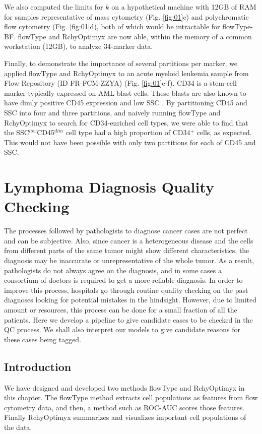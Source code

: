 We also computed the limits for $k$ on a hypothetical machine with 12GB of RAM for samples representative of mass cytometry (Fig. \ref{fig:01}c) and polychromatic flow cytometry (Fig. \ref{fig:01}d), both of which would be intractable for flowType-BF.
flowType and RchyOptimyx are now able, within the memory of a common workstation (12GB), to analyze 34-marker data. 

Finally, to demonstrate the importance of several partitions per marker, we applied flowType and RchyOptimyx to an acute myeloid leukemia sample from Flow Repository (ID FR-FCM-ZZYA) (Fig. \ref{fig:01}e-f).
CD34 is a stem-cell marker typically expressed on AML blast cells. These blasts are also known to have dimly positive CD45 expression and low SSC \cite{Vial2001}. 
By partitioning CD45 and SSC into four and three partitions, and naively running flowType and RchyOptimyx to search for CD34-enriched cell types, we were able to find that the SSC$^{low}$CD45$^{dim}$ cell type had a high proportion of CD34$^+$ cells, as expected.
This would not have been possible with only two partitions for each of CD45 and SSC.


\section{Lymphoma Diagnosis Quality Checking}
The processes followed by pathologists to diagnose cancer cases are not perfect and can be subjective. Also, since cancer is a heterogeneous disease and the cells from different parts of the same tumor might show different characteristics, the diagnosis may be inaccurate or unrepresentative of the whole tumor. As a result, pathologists do not always agree on the diagnosis, and in some cases a consortium of doctors is required to get a more reliable diagnosis. In order to improve this process, hospitals go through routine quality checking on the past diagnoses looking for potential mistakes in the hindsight. However, due to limited amount or resources, this process can be done for a small fraction of all the patients. Here we develop a pipeline to give candidate cases to be checked in the QC process. We shall also interpret our models to give candidate reasons for these cases being tagged.

\subsection{Introduction}
We have designed and developed two methods flowType and RchyOptimyx in this chapter.
The flowType method extracts cell populations as features from flow cytometry data, and then, a method such as ROC-AUC scores those features. Finally RchyOptimyx summarizes and visualizes important cell populations of the data.


